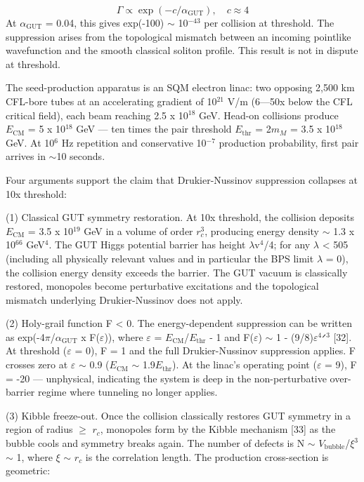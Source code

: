\documentclass[12pt,a4paper]{article}
\begin{document}
\begin{equation}
\Gamma \propto \exp(-c/\alpha_\text{GUT}), \quad c \approx 4
\end{equation}
At $\alpha_{\text{GUT}}$ = 0.04, this gives exp(-100) $\sim$ 10$^{-43}$ per collision at threshold. The suppression arises from the topological mismatch between an incoming pointlike wavefunction and the smooth classical soliton profile. This result is not in dispute at threshold.

The seed-production apparatus is an SQM electron linac: two opposing 2,500 km CFL-bore tubes at an accelerating gradient of 10$^{21}$ V/m (6---50x below the CFL critical field), each beam reaching 2.5 x 10$^{18}$ GeV. Head-on collisions produce $E_{\text{CM}}$ = 5 x 10$^{18}$ GeV --- ten times the pair threshold $E_{\text{thr}}$ = 2$m_M$ = 3.5 x 10$^{18}$ GeV. At 10$^{6}$ Hz repetition and conservative 10$^{-7}$ production probability, first pair arrives in $\sim$10 seconds.

Four arguments support the claim that Drukier-Nussinov suppression collapses at 10x threshold:

(1) Classical GUT symmetry restoration. At 10x threshold, the collision deposits $E_{\text{CM}}$ = 3.5 x 10$^{19}$ GeV in a volume of order $r_c ^{3}$, producing energy density $\sim$ 1.3 x 10$^{66}$ GeV$^{4}$. The GUT Higgs potential barrier has height $\lambda$v$^{4}$/4; for any $\lambda$ < 505 (including all physically relevant values and in particular the BPS limit $\lambda$ = 0), the collision energy density exceeds the barrier. The GUT vacuum is classically restored, monopoles become perturbative excitations and the topological mismatch underlying Drukier-Nussinov does not apply.

(2) Holy-grail function F < 0. The energy-dependent suppression can be written as exp(-4$\pi$/$\alpha_{\text{GUT}}$ x F($\varepsilon$)), where $\varepsilon$ = $E_{\text{CM}}$/$E_{\text{thr}}$ - 1 and F($\varepsilon$) $\sim$ 1 - (9/8)$\varepsilon ^{4}$ᐟ$^{3}$ [32]. At threshold ($\varepsilon$ = 0), F = 1 and the full Drukier-Nussinov suppression applies. F crosses zero at $\varepsilon$ $\sim$ 0.9 ($E_{\text{CM}}$ $\sim$ 1.9$E_{\text{thr}}$). At the linac's operating point ($\varepsilon$ = 9), F = -20 --- unphysical, indicating the system is deep in the non-perturbative over-barrier regime where tunneling no longer applies.

(3) Kibble freeze-out. Once the collision classically restores GUT symmetry in a region of radius $\geq$ $r_c$, monopoles form by the Kibble mechanism [33] as the bubble cools and symmetry breaks again. The number of defects is N $\sim$ $V_{\text{bubble}}$/$\xi ^{3}$ $\sim$ 1, where $\xi$ $\sim$ $r_c$ is the correlation length. The production cross-section is geometric:
\end{document}
